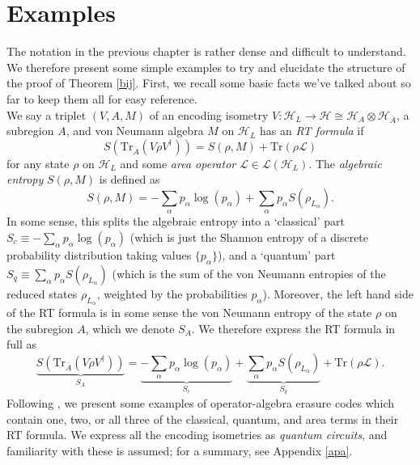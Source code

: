 \documentclass[12pt,a4paper]{report}
\numberwithin{equation}{section}
\newcommand{\ol}[1]{\overline{#1}}
\newcommand{\tr}{\text{Tr}}
\theoremstyle{definition}
\theoremstyle{theorem}
\theoremstyle{theorem}
\theoremstyle{example}
\theoremstyle{definition}
\begin{document}
\chapter{Examples}\label{chap4}
The notation in the previous chapter is rather dense and difficult to understand. We therefore present some simple examples to try and elucidate the structure of the proof of Theorem \ref{bij}. First, we recall some basic facts we've talked about so far to keep them all for easy reference.\\
We say a triplet $(V,A,M)$ of an encoding isometry $V:\mathcal{H}_{L}\to\mathcal{H}\cong\mathcal{H}_{A}\otimes\mathcal{H}_{\ol{A}}$, a subregion $A$, and von Neumann algebra $M$ on $\mathcal{H}_{L}$ has an \textit{RT formula} if
\begin{equation}
	S\left(\tr_{\ol{A}}\left(V\rho V^{\dagger}\right)\right)=S(\rho,M)+\tr\left(\rho\mathcal{L}\right)
\end{equation}
for any state $\rho$ on $\mathcal{H}_{L}$ and some \textit{area operator} $\mathcal{L}\in\mathcal{L}(\mathcal{H}_{L})$. The \textit{algebraic entropy} $S(\rho,M)$ is defined as
\begin{equation}
	S(\rho,M)=-\sum_{\alpha}p_{\alpha}\log\left(p_{\alpha}\right)+\sum_{\alpha}p_{\alpha}S\left(\rho_{L_{\alpha}}\right).
\end{equation} 
In some sense, this splits the algebraic entropy into a `classical' part $S_{c}\equiv-\sum_{\alpha}p_{\alpha}\log(p_{\alpha})$ (which is just the Shannon entropy of a discrete probability distribution taking values $\{p_{\alpha}\}$), and a `quantum' part $S_{q}\equiv \sum_{\alpha}p_{\alpha}S\left(\rho_{L_{\alpha}}\right)$ (which is the sum of the von Neumann entropies of the reduced states $\rho_{L_{\alpha}}$, weighted by the probabilities $p_{\alpha}$). Moreover, the left hand side of the RT formula is in some sense the von Neumann entropy of the state $\rho$ on the subregion $A$, which we denote $S_{A}$. We therefore express the RT formula in full as
\begin{equation}
	\underbrace{S\left(\tr_{\ol{A}}\left(V\rho V^{\dagger}\right)\right)}_{S_{A}}=\underbrace{-\sum_{\alpha}p_{\alpha}\log\left(p_{\alpha}\right)}_{S_{c}}+\underbrace{\sum_{\alpha}p_{\alpha}S\left(\rho_{L_{\alpha}}\right)}_{S_{q}}+\tr\left(\rho\mathcal{L}\right).
\end{equation}
Following \cite{Pollack}, we present some examples of operator-algebra erasure codes which contain one, two, or all three of the classical, quantum, and area terms in their RT formula. We express all the encoding isometries as \textit{quantum circuits}, and familiarity with these is assumed; for a summary, see Appendix \ref{apa}.\\
\end{document}
